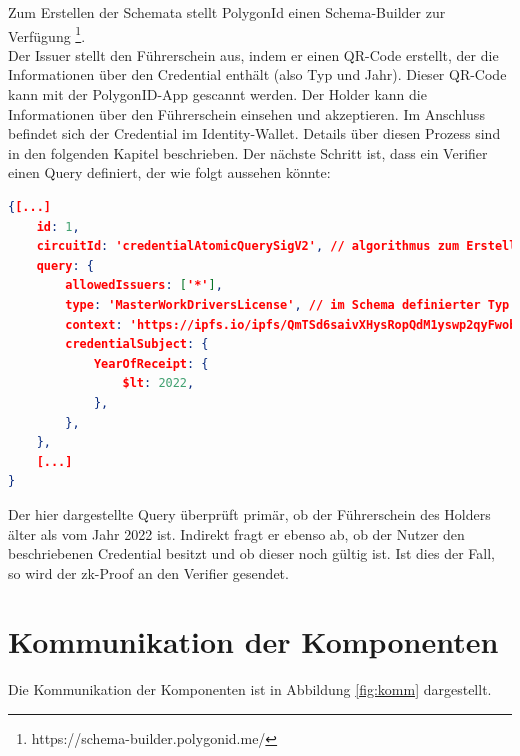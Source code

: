Zum Erstellen der Schemata stellt PolygonId einen Schema-Builder zur Verfügung \footnote{https://schema-builder.polygonid.me/}. \\
Der Issuer stellt den Führerschein aus, indem er einen QR-Code erstellt, der die Informationen über den Credential enthält (also Typ und Jahr). Dieser QR-Code kann mit der PolygonID-App gescannt werden. Der Holder kann die Informationen über den Führerschein einsehen und akzeptieren. Im Anschluss befindet sich der Credential im Identity-Wallet. Details über diesen Prozess sind in den folgenden Kapitel beschrieben. Der nächste Schritt ist, dass ein Verifier einen Query definiert, der wie folgt aussehen könnte:
\begin{lstlisting}[language=json,firstnumber=1]
{[...]
	id: 1,
	circuitId: 'credentialAtomicQuerySigV2', // algorithmus zum Erstellen des zk-Proofs
	query: {
		allowedIssuers: ['*'],
		type: 'MasterWorkDriversLicense', // im Schema definierter Typ
		context: 'https://ipfs.io/ipfs/QmTSd6saivXHysRopQdM1yswp2qyFwobL7fwuFpkVTS8gd',
		credentialSubject: {
			YearOfReceipt: {
				$lt: 2022,
			},
		},
	},
	[...]
}
\end{lstlisting}
Der hier dargestellte Query überprüft primär, ob der Führerschein des Holders älter als vom Jahr 2022 ist. Indirekt fragt er ebenso ab, ob der Nutzer den beschriebenen Credential besitzt und ob dieser noch gültig ist. Ist dies der Fall, so wird der zk-Proof an den Verifier gesendet.

\section{Kommunikation der Komponenten}
Die Kommunikation der Komponenten ist in Abbildung \ref{fig:komm} dargestellt.

